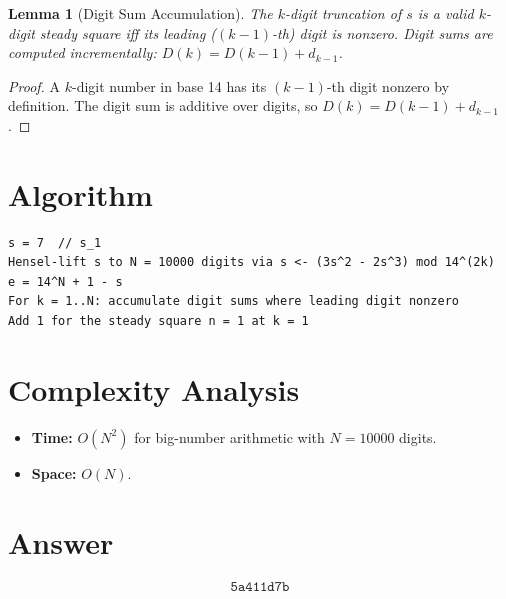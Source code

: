 \documentclass[12pt]{article}
\newtheorem{lemma}[theorem]{Lemma}
\begin{document}
\begin{lemma}[Digit Sum Accumulation]
The $k$-digit truncation of $s$ is a valid $k$-digit steady square iff its leading ($(k-1)$-th) digit is nonzero. Digit sums are computed incrementally: $D(k) = D(k-1) + d_{k-1}$.
\end{lemma}

\begin{proof}
A $k$-digit number in base 14 has its $(k-1)$-th digit nonzero by definition. The digit sum is additive over digits, so $D(k) = D(k-1) + d_{k-1}$.
\end{proof}

\section{Algorithm}

\begin{verbatim}
s = 7  // s_1
Hensel-lift s to N = 10000 digits via s <- (3s^2 - 2s^3) mod 14^(2k)
e = 14^N + 1 - s
For k = 1..N: accumulate digit sums where leading digit nonzero
Add 1 for the steady square n = 1 at k = 1
\end{verbatim}

\section{Complexity Analysis}

\begin{itemize}
\item \textbf{Time:} $O(N^2)$ for big-number arithmetic with $N = 10000$ digits.
\item \textbf{Space:} $O(N)$.
\end{itemize}

\section{Answer}

\[
\boxed{\texttt{5a411d7b}}
\]
\end{document}
